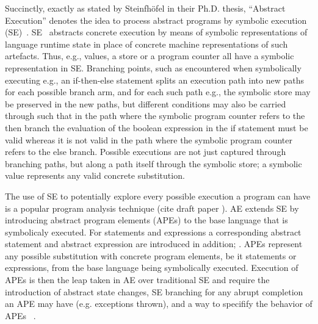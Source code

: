 
Succinctly, exactly as stated by Steinfhöfel in their Ph.D. thesis, ``Abstract Execution'' denotes the idea to process abstract programs by symbolic execution (SE)~\cite{steinhoefel-20}.
SE~\cite{DBLP:journals/csur/BaldoniCDDF18,DBLP:journals/ac/YangFBCW19} abstracts concrete execution by means of symbolic representations of language runtime
state in place of concrete machine representations of such artefacts.
Thus, e.g., values, a store or a program counter all have a symbolic representation in SE.
Branching points, such as encountered when symbolically executing e.g., an if-then-else statement splits an execution path into new paths for each possible branch arm, and for each such
path e.g., the symbolic store may be preserved in the new paths, but different conditions may also be carried through such that in the path where the symbolic program counter refers
to the then branch the evaluation of the boolean expression in the if statement must be valid whereas it is not valid in the path where the symbolic program counter refers to the else branch.
Possible executions are not just captured through branching paths, but along a path itself through the symbolic store; a symbolic value represents any valid concrete substitution.


The use of SE to potentially explore every possible execution a program can have is a popular program analysis technique (cite draft paper \cite{xxx}). AE extends SE by
introducing abstract program elements (APEs) to the base language that is symbolicaly executed.
For statements and expressions a corresponding abstract statement and abstract expression are introduced in addition; .
APEs represent any possible substitution with concrete program elements, be it statements or expressions, from the base language being symbolically executed.
Execution of APEs is then the leap taken in AE over traditional SE and require the introduction of abstract state changes, SE branching for
any abrupt completion an APE may have (e.g. exceptions thrown),  and a way to specifify the behavior of APEs ~\cite{steinhoefel-20}.

